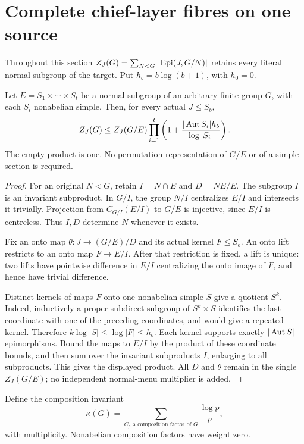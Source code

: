 \section{Complete chief-layer fibres on one source}
\label{sec:chief-fibres}
Throughout this section $Z_J(G)=\sum_{N\lhd G}|\operatorname{Epi}(J,G/N)|$
retains every literal normal subgroup of the target. Put
$h_b=b\log(b+1)$, with $h_0=0$.

\begin{lemma}\label{lem:semisimple-fibre}
Let $E=S_1\times\cdots\times S_t$ be a normal subgroup of an
arbitrary finite group $G$, with each $S_i$ nonabelian simple. Then,
for every actual $J\leq S_b$,
\[
 Z_J(G)\leq Z_J(G/E)
   \prod_{i=1}^t\left(1+\frac{|\operatorname{Aut} S_i|h_b}{\log|S_i|}\right).
\]
The empty product is one. No permutation representation of $G/E$
or of a simple section is required.
\end{lemma}
\begin{proof}
For an original $N\lhd G$, retain $I=N\cap E$ and $D=NE/E$.
The subgroup $I$ is an invariant subproduct. In $G/I$, the group
$N/I$ centralizes $E/I$ and intersects it trivially. Projection from
$C_{G/I}(E/I)$ to $G/E$ is injective, since $E/I$ is centreless.
Thus $I,D$ determine $N$ whenever it exists.

Fix an onto map $\theta:J\to(G/E)/D$ and its actual kernel
$F\leq S_b$. An onto lift restricts to an onto map $F\to E/I$.
After that restriction is fixed, a lift is unique: two lifts have
pointwise difference in $E/I$ centralizing the onto image of $F$,
and hence have trivial difference.

Distinct kernels of maps $F$ onto one nonabelian simple $S$ give
a quotient $S^k$. Indeed, inductively a proper subdirect subgroup
of $S^k\times S$ identifies the last coordinate with one of the
preceding coordinates, and would give a repeated kernel. Therefore
$k\log|S|\leq\log|F|\leq h_b$. Each kernel supports exactly
$|\operatorname{Aut} S|$ epimorphisms. Bound the maps to $E/I$ by the product
of these coordinate bounds, and then sum over the invariant
subproducts $I$, enlarging to all subproducts. This gives the
displayed product. All $D$ and $\theta$ remain in the single
$Z_J(G/E)$; no independent normal-menu multiplier is added.
\end{proof}

Define the composition invariant
\[
 \kappa(G)=\sum_{C_p\text{ a composition factor of }G}\frac{\log p}{p},
\]
with multiplicity. Nonabelian composition factors have weight zero.

